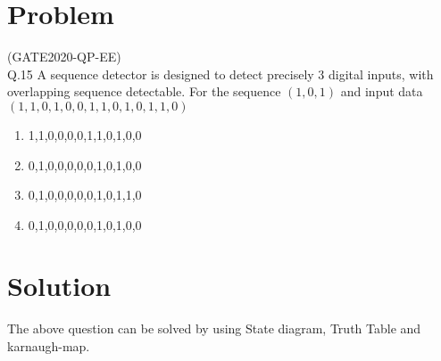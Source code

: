 \documentclass[journal,12pt,twocolumn]{IEEEtran}
\title{\ktitle}
\author{\kauthor\\\kcontact\\\kmodule}
\begin{document}
\maketitle
\tableofcontents
\graphicspath{{./Documents}{./figs}}
\section{\textbf{Problem}}
(GATE2020-QP-EE)\\
Q.15 A sequence detector is designed to detect precisely 3 digital inputs, with overlapping sequence detectable. For the sequence $(1,0,1)$ and input data $(1,1,0,1,0,0,1,1,0,1,0,1,1,0)$ 
\begin{enumerate}
    \item 1,1,0,0,0,0,1,1,0,1,0,0
    \item 0,1,0,0,0,0,0,1,0,1,0,0
    \item 0,1,0,0,0,0,0,1,0,1,1,0
    \item 0,1,0,0,0,0,0,1,0,1,0,0
\end{enumerate}

\section{\textbf{Solution}} 
The above question can be solved by using State diagram, Truth Table and karnaugh-map.\\
 
\end{document}
